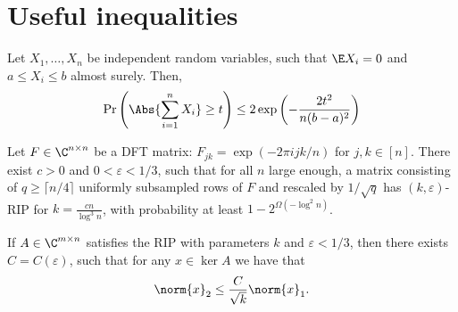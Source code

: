 \section{Useful inequalities}

\begin{lemma}
\label{lem:hoeffding}
    Let \(X_1, \ldots, X_n\) be independent random variables, such that \(\E X_i = 0\) and \(a \leq X_i \leq b\) almost surely. Then,
    \begin{equation}
        \Pr\left(\Abs{\sum_{i=1}^n X_i} \geq t\right) \leq 2\exp\left( - \frac{2 t^2}{n (b - a)^2}\right)
    \end{equation}
\end{lemma}

\begin{lemma}
\label{lem:rip_dft}
Let \(F \in \C^{n \times n}\) be a DFT matrix: \(F_{jk} = \exp(-2 \pi i jk/n)\) for \(j, k \in [n]\). There exist \(c > 0\) and \(0 < \varepsilon < 1 / 3\), such that for all \(n\) large enough, a matrix consisting of \(q \geq \lceil n / 4 \rceil\) uniformly subsampled rows of \(F\) and rescaled by \(1 / \sqrt{q}\) has \((k, \varepsilon)\)-RIP for \(k = \frac{c n}{\log^3 n}\), with probability at least \(1 - 2^{\Omega(-\log^2 n)}\).
\end{lemma}
\begin{lemma}
\label{lem:rip_l2l1}
    If \(A \in \C^{m \times n}\) satisfies the RIP with parameters \(k\) and \(\varepsilon < 1/3\), then there exists \(C = C(\varepsilon)\), such that for any \(x \in \ker{A}\) we have that 
    \begin{equation}
        \norm{x}_2 \leq \frac{C}{\sqrt{k}}\norm{x}_1.
    \end{equation}
\end{lemma}